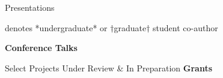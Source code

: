 \documentclass [11pt,letterpaper]{article}
\begin{document}
\begin{rSection}{\textrm{Presentations}}
%
\vspace{-1mm}\begin{center}\footnotesize{denotes *undergraduate* or $\dagger$graduate$\dagger$ student co-author}\end{center}\vspace{-3mm}
{\large {\bf Conference Talks}}\begin{etaremune}

%
\end{etaremune}
\end{rSection}
%

%
\begin{rSection}{ \textrm{Select Projects Under Review \& In Preparation}}
{\large \textbf{Grants}}
\begin{etaremune}

%


%




\end{etaremune}\end{rSection}
%
%

\end{document}
